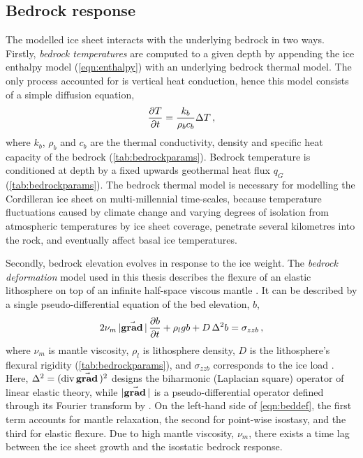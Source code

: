 \documentclass{article}
\newcommand{\vect}[1]{\va*{#1}} %
\renewcommand{\div}[1]{\mathrm{div}\,#1}            %
\renewcommand{\grad}[1]{\vect{\mathrm{grad}}\,#1}   %
\begin{document}
\subsection{Bedrock response}

The modelled ice sheet interacts with the underlying bedrock in two ways.
Firstly, \emph{bedrock temperatures} are computed to a given depth by
appending the
ice enthalpy model (\ref{eqn:enthalpy}) with an underlying bedrock thermal
model. The only process accounted for is vertical heat conduction, hence this model
consists of a simple diffusion equation,
\begin{equation}
    \pdv{T}{t} = \frac{k_b}{\rho_b c_b} \Delta T \,,
\end{equation}
where $k_b$, $\rho_b$ and $c_b$ are the thermal conductivity, density and
specific heat capacity of the bedrock (\cref{tab:bedrockparams}).
Bedrock temperature is conditioned at depth by a fixed upwards geothermal heat
flux $q_G$  (\cref{tab:bedrockparams}). The bedrock thermal model
is necessary for modelling the Cordilleran ice sheet on multi-millennial
time-scales, because temperature fluctuations caused by climate change and
varying degrees of isolation from atmospheric temperatures by ice sheet
coverage, penetrate several kilometres
into the rock, and eventually affect basal ice temperatures.

Secondly, bedrock elevation evolves in response to the ice weight. The
\emph{bedrock deformation} model used in this thesis describes the flexure of
an elastic
lithosphere on top of an infinite half-space viscous mantle
\citep{Lingle.Clark.1985}. It can be described by a single pseudo-differential
equation of the bed elevation, $b$,
\begin{equation}
    \label{eqn:beddef}
    2\nu_m\,|\grad|\,\pdv{b}{t} + \rho_l g b + D\,\Delta^2 b = \sigma_{zzb} \,,
\end{equation}
where $\nu_m$ is mantle viscosity, $\rho_l$ is lithosphere density, $D$ is the
lithosphere's flexural rigidity (\cref{tab:bedrockparams}), and $\sigma_{zzb}$
corresponds to the ice load
\citep{Bueler.etal.2007}. Here, ${\Delta^2 = (\div\grad{})^2}$ designs the
biharmonic (Laplacian square) operator of
linear elastic theory, while $|\grad{}|$ is a pseudo-differential operator
defined through its Fourier transform by \citet[Eq.~6]{Bueler.etal.2007}. On
the left-hand side of \cref{eqn:beddef}, the first term accounts for mantle
relaxation, the second for point-wise isostasy, and the third for elastic
flexure. Due to high mantle viscosity, $\nu_m$, there exists a time lag between
the ice sheet growth and the isostatic bedrock response.
\end{document}

